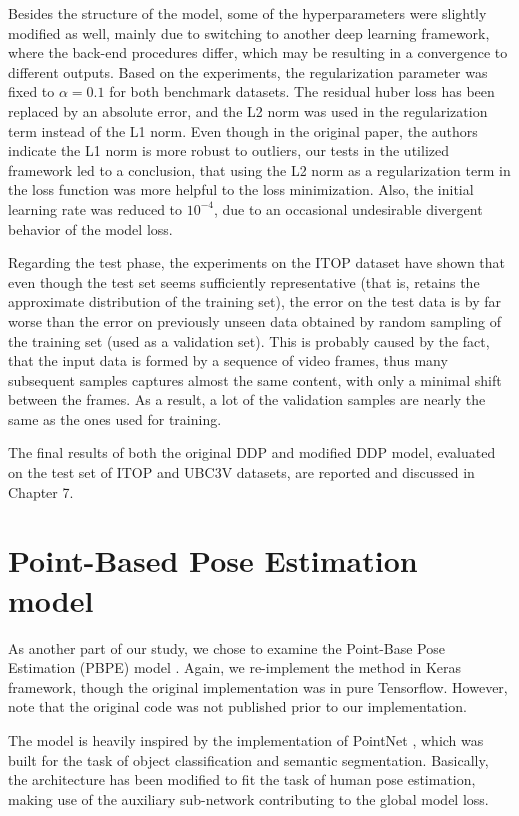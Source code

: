 \noindent Besides the structure of the model, some of the hyperparameters were slightly modified as well, mainly due to switching to another deep learning framework, where the back-end procedures differ, which may be resulting in a convergence to different outputs. Based on the experiments, the regularization parameter was fixed to $\alpha = 0.1$ for both benchmark datasets. The residual huber loss has been replaced by an absolute error, and the L2 norm was used in the regularization term instead of the L1 norm. Even though in the original paper, the authors indicate the L1 norm is more robust to outliers, our tests in the utilized framework led to a conclusion, that using the L2 norm as a regularization term in the loss function was more helpful to the loss minimization. Also, the initial learning rate was reduced to $10^{-4}$, due to an occasional undesirable divergent behavior of the model loss.\par
\vspace{5mm}
\noindent Regarding the test phase, the experiments on the ITOP dataset have shown that even though the test set seems sufficiently representative (that is, retains the approximate distribution of the training set), the error on the test data is by far worse than the error on previously unseen data obtained by random sampling of the training set (used as a validation set). This is probably caused by the fact, that the input data is formed by a sequence of video frames, thus many subsequent samples captures almost the same content, with only a minimal shift between the frames. As a result, a lot of the validation samples are nearly the same as the ones used for training.\par
\vspace{5mm}
\noindent
The final results of both the original DDP and modified DDP model, evaluated on the test set of ITOP and UBC3V datasets, are reported and discussed in Chapter 7.


\section{Point-Based Pose Estimation model}

As another part of our study, we chose to examine the Point-Base Pose Estimation (PBPE) model \cite{Ali19}. Again, we re-implement the method in Keras framework, though the original implementation was in pure Tensorflow. However, note that the original code was not published prior to our implementation.\par
\vspace{5mm}
\noindent %
The model is heavily inspired by the implementation of PointNet \cite{DBLP:journals/corr/QiSMG16}, which was built for the task of object classification and semantic segmentation. Basically, the architecture has been modified to fit the task of human pose estimation, making use of the auxiliary sub-network contributing to the global model loss.


